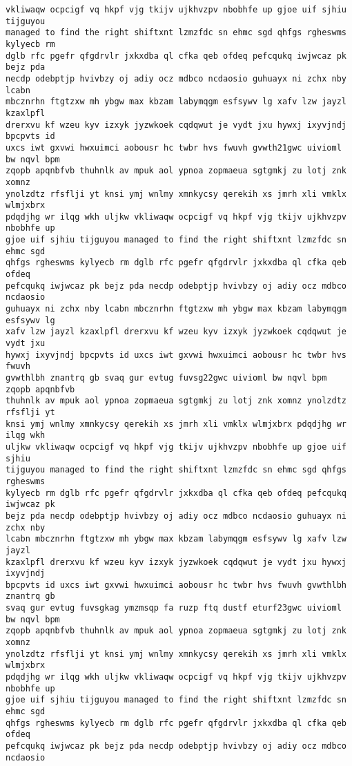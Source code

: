 \documentclass[11pt]{article}
\begin{document}
\begin{tcolorbox}[breakable, size=fbox, boxrule=.5pt, pad at break*=1mm, opacityfill=0]
\begin{Verbatim}[commandchars=\\\{\}]
vkliwaqw ocpcigf vq hkpf vjg tkijv ujkhvzpv nbobhfe up gjoe uif sjhiu tijguyou
managed to find the right shiftxnt lzmzfdc sn ehmc sgd qhfgs rgheswms kylyecb rm
dglb rfc pgefr qfgdrvlr jxkxdba ql cfka qeb ofdeq pefcqukq iwjwcaz pk bejz pda
necdp odebptjp hvivbzy oj adiy ocz mdbco ncdaosio guhuayx ni zchx nby lcabn
mbcznrhn ftgtzxw mh ybgw max kbzam labymqgm esfsywv lg xafv lzw jayzl kzaxlpfl
drerxvu kf wzeu kyv izxyk jyzwkoek cqdqwut je vydt jxu hywxj ixyvjndj bpcpvts id
uxcs iwt gxvwi hwxuimci aobousr hc twbr hvs fwuvh gvwth21gwc uivioml bw nqvl bpm
zqopb apqnbfvb thuhnlk av mpuk aol ypnoa zopmaeua sgtgmkj zu lotj znk xomnz
ynolzdtz rfsflji yt knsi ymj wnlmy xmnkycsy qerekih xs jmrh xli vmklx wlmjxbrx
pdqdjhg wr ilqg wkh uljkw vkliwaqw ocpcigf vq hkpf vjg tkijv ujkhvzpv nbobhfe up
gjoe uif sjhiu tijguyou managed to find the right shiftxnt lzmzfdc sn ehmc sgd
qhfgs rgheswms kylyecb rm dglb rfc pgefr qfgdrvlr jxkxdba ql cfka qeb ofdeq
pefcqukq iwjwcaz pk bejz pda necdp odebptjp hvivbzy oj adiy ocz mdbco ncdaosio
guhuayx ni zchx nby lcabn mbcznrhn ftgtzxw mh ybgw max kbzam labymqgm esfsywv lg
xafv lzw jayzl kzaxlpfl drerxvu kf wzeu kyv izxyk jyzwkoek cqdqwut je vydt jxu
hywxj ixyvjndj bpcpvts id uxcs iwt gxvwi hwxuimci aobousr hc twbr hvs fwuvh
gvwthlbh znantrq gb svaq gur evtug fuvsg22gwc uivioml bw nqvl bpm zqopb apqnbfvb
thuhnlk av mpuk aol ypnoa zopmaeua sgtgmkj zu lotj znk xomnz ynolzdtz rfsflji yt
knsi ymj wnlmy xmnkycsy qerekih xs jmrh xli vmklx wlmjxbrx pdqdjhg wr ilqg wkh
uljkw vkliwaqw ocpcigf vq hkpf vjg tkijv ujkhvzpv nbobhfe up gjoe uif sjhiu
tijguyou managed to find the right shiftxnt lzmzfdc sn ehmc sgd qhfgs rgheswms
kylyecb rm dglb rfc pgefr qfgdrvlr jxkxdba ql cfka qeb ofdeq pefcqukq iwjwcaz pk
bejz pda necdp odebptjp hvivbzy oj adiy ocz mdbco ncdaosio guhuayx ni zchx nby
lcabn mbcznrhn ftgtzxw mh ybgw max kbzam labymqgm esfsywv lg xafv lzw jayzl
kzaxlpfl drerxvu kf wzeu kyv izxyk jyzwkoek cqdqwut je vydt jxu hywxj ixyvjndj
bpcpvts id uxcs iwt gxvwi hwxuimci aobousr hc twbr hvs fwuvh gvwthlbh znantrq gb
svaq gur evtug fuvsgkag ymzmsqp fa ruzp ftq dustf eturf23gwc uivioml bw nqvl bpm
zqopb apqnbfvb thuhnlk av mpuk aol ypnoa zopmaeua sgtgmkj zu lotj znk xomnz
ynolzdtz rfsflji yt knsi ymj wnlmy xmnkycsy qerekih xs jmrh xli vmklx wlmjxbrx
pdqdjhg wr ilqg wkh uljkw vkliwaqw ocpcigf vq hkpf vjg tkijv ujkhvzpv nbobhfe up
gjoe uif sjhiu tijguyou managed to find the right shiftxnt lzmzfdc sn ehmc sgd
qhfgs rgheswms kylyecb rm dglb rfc pgefr qfgdrvlr jxkxdba ql cfka qeb ofdeq
pefcqukq iwjwcaz pk bejz pda necdp odebptjp hvivbzy oj adiy ocz mdbco ncdaosio

\end{Verbatim}
\end{tcolorbox}
\end{document}

